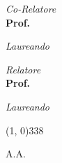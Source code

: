 \begin{titlepage}
\begin{center}
{\begin{large}
    \begin{flushleft}
    \textit{Co-Relatore}\\ 
    \vspace{5pt} 
    \textbf{Prof. \myCoSupervisor}
    \end{flushleft}

    \vspace*{-4.23cm} 

    \begin{flushright}
    \textit{Laureando}\\ 
    \vspace{5pt} 
    \textbf{\myName}
    \end{flushright}
    \end{large}
}{
    \begin{large}
    \begin{flushleft}
    \textit{Relatore}\\ 
    \vspace{5pt} 
    \textbf{Prof. \mySupervisor}
    \end{flushleft}

    \vspace*{-2.36cm} 

    \begin{flushright}
    \textit{Laureando}\\ 
    \vspace{5pt} 
    \textbf{\myName}
    \end{flushright}
    \end{large}
}

\vfill

\line(1, 0){338} \\
\begin{normalsize}
\textsc{A.A. \myAA}
\end{normalsize}

\end{center}
\end{titlepage}
